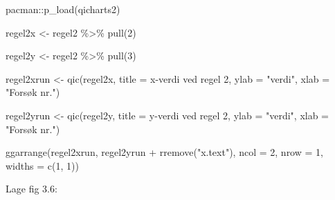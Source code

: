 \documentclass[
]{book}
\newenvironment{Shaded}{\begin{snugshade}}{\end{snugshade}}
\newcommand{\AttributeTok}[1]{\textcolor[rgb]{0.77,0.63,0.00}{#1}}
\newcommand{\DecValTok}[1]{\textcolor[rgb]{0.00,0.00,0.81}{#1}}
\newcommand{\FunctionTok}[1]{\textcolor[rgb]{0.00,0.00,0.00}{#1}}
\newcommand{\NormalTok}[1]{#1}
\newcommand{\OtherTok}[1]{\textcolor[rgb]{0.56,0.35,0.01}{#1}}
\newcommand{\SpecialCharTok}[1]{\textcolor[rgb]{0.00,0.00,0.00}{#1}}
\newcommand{\StringTok}[1]{\textcolor[rgb]{0.31,0.60,0.02}{#1}}
\begin{document}
\begin{Shaded}
\begin{Highlighting}[]
\NormalTok{pacman}\SpecialCharTok{::}\FunctionTok{p\_load}\NormalTok{(qicharts2)}

\NormalTok{regel2x }\OtherTok{\textless{}{-}}\NormalTok{ regel2 }\SpecialCharTok{\%\textgreater{}\%} \FunctionTok{pull}\NormalTok{(}\DecValTok{2}\NormalTok{)}

\NormalTok{regel2y }\OtherTok{\textless{}{-}}\NormalTok{ regel2 }\SpecialCharTok{\%\textgreater{}\%} \FunctionTok{pull}\NormalTok{(}\DecValTok{3}\NormalTok{)}

\NormalTok{regel2xrun }\OtherTok{\textless{}{-}} \FunctionTok{qic}\NormalTok{(regel2x, }\AttributeTok{title =} \StringTok{\textquotesingle{}x{-}verdi ved regel 2\textquotesingle{}}\NormalTok{, }\AttributeTok{ylab =} \StringTok{"verdi"}\NormalTok{, }\AttributeTok{xlab =} \StringTok{"Forsøk nr."}\NormalTok{)}

\NormalTok{regel2yrun }\OtherTok{\textless{}{-}} \FunctionTok{qic}\NormalTok{(regel2y, }\AttributeTok{title =} \StringTok{\textquotesingle{}y{-}verdi ved regel 2\textquotesingle{}}\NormalTok{, }\AttributeTok{ylab =} \StringTok{"verdi"}\NormalTok{, }\AttributeTok{xlab =} \StringTok{"Forsøk nr."}\NormalTok{)}

\FunctionTok{ggarrange}\NormalTok{(regel2xrun, regel2yrun }\SpecialCharTok{+} \FunctionTok{rremove}\NormalTok{(}\StringTok{"x.text"}\NormalTok{), }\AttributeTok{ncol =} \DecValTok{2}\NormalTok{, }\AttributeTok{nrow =} \DecValTok{1}\NormalTok{,  }\AttributeTok{widths =} \FunctionTok{c}\NormalTok{(}\DecValTok{1}\NormalTok{, }\DecValTok{1}\NormalTok{))}
\end{Highlighting}
\end{Shaded}

Lage fig 3.6:
\end{document}
